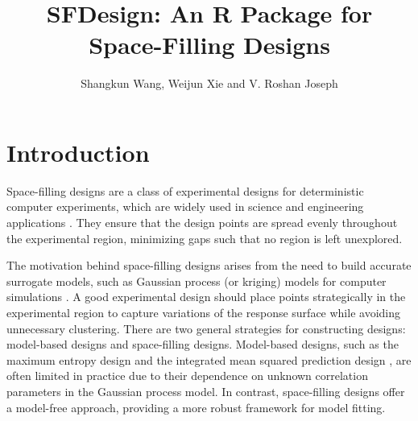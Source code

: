 \title{SFDesign: An R Package for Space-Filling Designs}
\author{Shangkun Wang, Weijun Xie and V. Roshan Joseph}

\maketitle




\section{Introduction}\label{sec:intro}
Space-filling designs are a class of experimental designs for deterministic computer experiments, which are widely used in science and engineering applications \citep{joseph2025}. They ensure that the design points are spread evenly throughout the experimental region, minimizing gaps such that no region is left unexplored. 

The motivation behind space-filling designs arises from the need to build accurate surrogate models, such as Gaussian process (or kriging) models for computer simulations \citep{santner2019design, gramacy2020surrogates}. A good experimental design should place points strategically in the experimental region to capture variations of the response surface while avoiding unnecessary clustering. There are two general strategies for constructing designs: model-based designs and space-filling designs. Model-based designs, such as the maximum entropy design \citep{currin1991bayesian} and the integrated mean squared prediction design \citep{sacks1989designs}, are often limited in practice due to their dependence on unknown correlation parameters in the Gaussian process model. In contrast, space-filling designs offer a model-free approach, providing a more robust framework for model fitting. 

